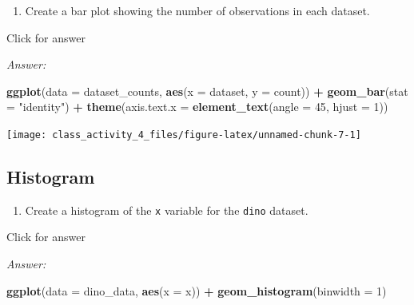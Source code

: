 \documentclass[
]{book}
\newenvironment{Shaded}{\begin{snugshade}}{\end{snugshade}}
\newcommand{\AttributeTok}[1]{\textcolor[rgb]{0.13,0.29,0.53}{#1}}
\newcommand{\DecValTok}[1]{\textcolor[rgb]{0.00,0.00,0.81}{#1}}
\newcommand{\FunctionTok}[1]{\textcolor[rgb]{0.13,0.29,0.53}{\textbf{#1}}}
\newcommand{\NormalTok}[1]{#1}
\newcommand{\SpecialCharTok}[1]{\textcolor[rgb]{0.81,0.36,0.00}{\textbf{#1}}}
\newcommand{\StringTok}[1]{\textcolor[rgb]{0.31,0.60,0.02}{#1}}
\providecommand{\tightlist}{%
  \setlength{\itemsep}{0pt}\setlength{\parskip}{0pt}}
\begin{document}
\begin{enumerate}
\def\labelenumi{\alph{enumi}.}
\setcounter{enumi}{1}
\tightlist
\item
  Create a bar plot showing the number of observations in each dataset.
\end{enumerate}

Click for answer

\emph{Answer:}

\begin{Shaded}
\begin{Highlighting}[]
\FunctionTok{ggplot}\NormalTok{(}\AttributeTok{data =}\NormalTok{ dataset\_counts, }\FunctionTok{aes}\NormalTok{(}\AttributeTok{x =}\NormalTok{ dataset, }\AttributeTok{y =}\NormalTok{ count)) }\SpecialCharTok{+}
  \FunctionTok{geom\_bar}\NormalTok{(}\AttributeTok{stat =} \StringTok{"identity"}\NormalTok{) }\SpecialCharTok{+}
  \FunctionTok{theme}\NormalTok{(}\AttributeTok{axis.text.x =} \FunctionTok{element\_text}\NormalTok{(}\AttributeTok{angle =} \DecValTok{45}\NormalTok{, }\AttributeTok{hjust =} \DecValTok{1}\NormalTok{)) }
\end{Highlighting}
\end{Shaded}

\texttt{[image: class\_activity\_4\_files/figure-latex/unnamed-chunk-7-1]}

\hypertarget{histogram}{%
\subsection{Histogram}\label{histogram}}

\begin{enumerate}
\def\labelenumi{\alph{enumi}.}
\tightlist
\item
  Create a histogram of the \texttt{x} variable for the \texttt{dino} dataset.
\end{enumerate}

Click for answer

\emph{Answer:}

\begin{Shaded}
\begin{Highlighting}[]
\FunctionTok{ggplot}\NormalTok{(}\AttributeTok{data =}\NormalTok{ dino\_data, }\FunctionTok{aes}\NormalTok{(}\AttributeTok{x =}\NormalTok{ x)) }\SpecialCharTok{+}
  \FunctionTok{geom\_histogram}\NormalTok{(}\AttributeTok{binwidth =} \DecValTok{1}\NormalTok{) }
\end{Highlighting}
\end{Shaded}
\end{document}
